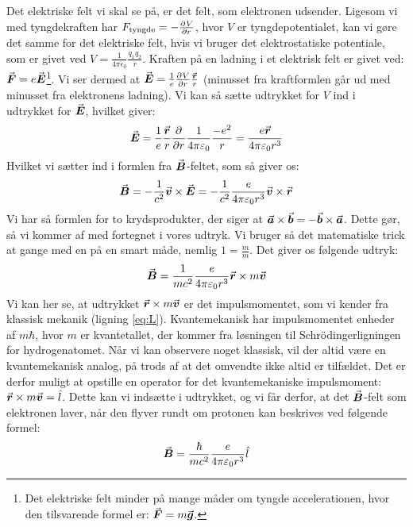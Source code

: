 \documentclass[../../Atom-ogMolekylefysik.tex]{subfiles}
\begin{document}
Det elektriske felt vi skal se på, er det felt, som elektronen udsender. Ligesom vi med tyngdekraften har $F_\text{tyngde}=-\pdif{r}{V}$, hvor $V$ er tyngdepotentialet, kan vi gøre det samme for det elektriske felt, hvis vi bruger det elektrostatiske potentiale, som er givet ved $V=\frac{1}{4\pi\epsilon_0}\frac{q_1q_2}{r}$. Kraften på en ladning i et elektrisk felt er givet ved: $\v F=e\v E$\footnote{Det elektriske felt minder på mange måder om tyngde accelerationen, hvor den tilsvarende formel er: $\v F=m\v g$.}. Vi ser dermed at $\v E=\frac{1}{e}\pdif{r}{V}\frac{\v{r}}{r}$ (minusset fra kraftformlen går ud med minusset fra elektronens ladning). Vi kan så sætte udtrykket for $V$ ind i udtrykket for $\v E$, hvilket giver:
\begin{equation}
    \v{E}=\frac{1}{e}\frac{\v{r}}{r}\pdif{r}{}\frac{1}{4\pi\epsilon_0}\frac{-e^2}{r}=\frac{e\v{r}}{4\pi\epsilon_0r^3}
\end{equation}
Hvilket vi sætter ind i formlen fra $\v B$-feltet, som så giver os:
\begin{equation}
    \v{B}=-\frac{1}{c^2}\v{v}\times\v{E}=-\frac{1}{c^2}\frac{e}{4\pi\epsilon_0r^3}\v{v}\times\v{r}
\end{equation}
Vi har så formlen for to krydsprodukter, der siger at $\v{a}\times\v{b}=-\v{b}\times\v{a}$.
Dette gør, så vi kommer af med fortegnet i vores udtryk. Vi bruger så det matematiske trick at gange med en på en smart måde, nemlig $1=\frac{m}{m}$. Det giver os følgende udtryk:
\begin{equation}
    \v{B}=\frac{1}{mc^2}\frac{e}{4\pi\epsilon_0r^3}\v{r}\times m\v{v}
\end{equation}
Vi kan her se, at udtrykket $\v{r}\times m\v{v}$ er det impulsmomentet, som vi kender fra klassisk mekanik (ligning \eqref{eq:L}). Kvantemekanisk har impulsmomentet enheder af $m\hbar$, hvor $m$ er kvantetallet, der kommer fra løsningen til Schrödingerligningen for hydrogenatomet.
Når vi kan observere noget klassisk, vil der altid være en kvantemekanisk analog, på trods af at det omvendte ikke altid er tilfældet. Det er derfor muligt at opstille en operator for det kvantemekaniske impulsmoment: $\v{r}\times m\v{v}=\hat{l}$.
Dette kan vi indsætte i udtrykket, og vi får derfor, at det $\v B$-felt som elektronen laver, når den flyver rundt om protonen kan beskrives ved følgende formel:
\begin{equation}
    \v{B}=\frac{\hbar}{mc^2}\frac{e}{4\pi\epsilon_0r^3}\hat{l}
\end{equation}
\end{document}
